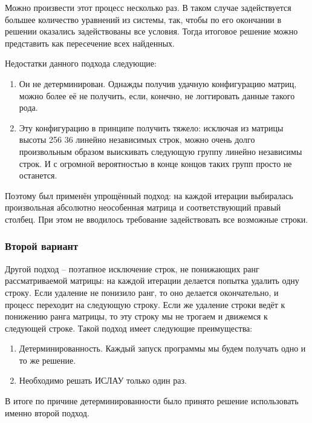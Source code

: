 Можно произвести этот процесс несколько раз. В таком случае задействуется большее количество уравнений из системы, так, чтобы по его окончании в решении оказались задействованы все условия. Тогда итоговое решение можно представить как пересечение всех найденных.

Недостатки данного подхода следующие:
\begin{enumerate}
	\item Он не детерминирован. Однажды получив удачную конфигурацию матриц, можно более её не получить, если, конечно, не логгировать данные такого рода.
	
	\item Эту конфигурацию в принципе получить тяжело: исключая из матрицы высоты 256 36 линейно независимых строк, можно очень долго произвольным образом выискивать следующую группу линейно независимы строк. И с огромной вероятностью в конце концов таких групп просто не останется.
\end{enumerate}

Поэтому был применён упрощённый подход: на каждой итерации выбиралась произвольная абсолютно неособенная матрица и соответствующий правый столбец. При этом не вводилось требование задействовать все возможные строки.

\subsubsection{Второй вариант}

Другой подход -- поэтапное исключение строк, не понижающих ранг рассматриваемой матрицы: на каждой итерации делается попытка удалить одну строку. Если удаление не понизило ранг, то оно делается окончательно, и процесс переходит на следующую строку. Если же удаление строки ведёт к понижению ранга матрицы, то эту строку мы не трогаем и движемся к следующей строке. Такой подход имеет следующие преимущества:
\begin{enumerate}
	\item Детерминированность. Каждый запуск программы мы будем получать одно и то же решение.
	
	\item Необходимо решать ИСЛАУ только один раз.
\end{enumerate}

В итоге по причине детерминированности было принято решение использовать именно второй подход.